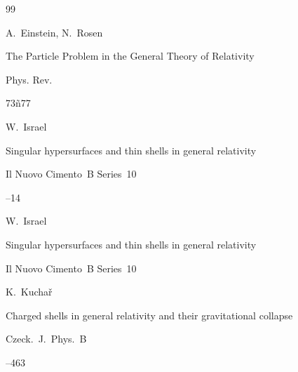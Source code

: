 \begin{thebibliography}{99}

\by A.~Einstein, N.~Rosen

\paper The Particle Problem in the General Theory of Relativity

\jour Phys. Rev.




\pages 73ñ77







\by W.~Israel

\paper Singular hypersurfaces and thin shells in general relativity

\jour Il Nuovo Cimento~B Series~10




--14





\by W.~Israel

\paper Singular hypersurfaces and thin shells in general relativity

\jour Il Nuovo Cimento~B Series~10









\by K.~Kucha\v{r}

\paper Charged shells in general relativity and their gravitational collapse

\jour Czeck.~J.~Phys.~B




--463


\end{thebibliography}

